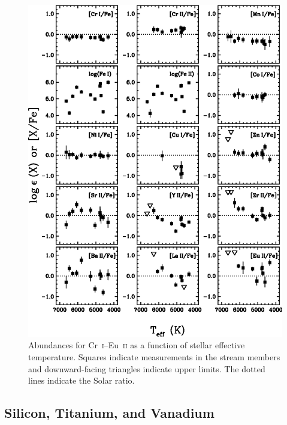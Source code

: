 \documentclass{emulateapj}
\begin{document}
\begin{figure}
\includegraphics[angle=0,width=7.0in]{fig05.eps}
\caption{
\label{abundteff2}
Abundances for Cr~\textsc{i}--Eu~\textsc{ii} 
as a function of stellar effective temperature.
Squares indicate measurements in the stream members and
downward-facing triangles indicate upper limits.
The dotted lines indicate the Solar ratio.
}
\end{figure}




\subsection{Silicon, Titanium, and Vanadium}
\label{si}
\end{document}
